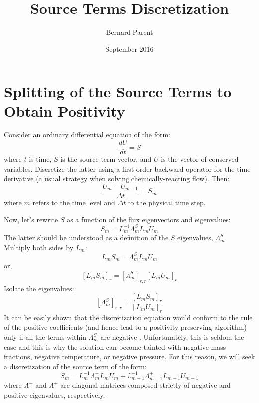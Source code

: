 \documentclass{warpdoc}
\author{
  Bernard Parent
}
\title{
  Source Terms Discretization
}
\date{
  September 2016
}
\begin{document}
\sloppy
  \pagestyle{headings}
  \setcounter{page}{1}
  \makewarpdoctitle
  \tableofcontents



\section{Splitting of the Source Terms to Obtain Positivity}

Consider an ordinary differential equation of the form:
%
\begin{equation}
\frac{d U}{d t}  = S 
\end{equation}
%
where $t$ is time, $S$ is the source term vector, and $U$ is the vector of conserved variables. Discretize the latter using a first-order backward operator for the time derivative (a usual strategy when solving chemically-reacting flow). Then:
%
\begin{equation}
\frac{U_{m}-U_{m-1}}{\Delta t} = S_{m} 
\label{eqn:disceq}
\end{equation}
%
where $m$ refers to the time level and $\Delta t$ to the physical time step.   

Now, let's rewrite $S$ as a function of the flux eigenvectors and eigenvalues:
%
\begin{equation}
 S_{m} = L^{-1}_{m} \Lambda_{m}^S L_{m} U_{m}
\label{eqn:S1}
\end{equation}
%
The latter should be understood as a definition of the $S$ eigenvalues, $\Lambda_{m}^S$. Multiply both sides by $L_{m}$:
%
\begin{equation}
 L_{m} S_{m} =  \Lambda_{m}^S L_{m} U_{m}
\end{equation}
%
or,
%
\begin{equation}
 \left[ L_{m} S_{m} \right]_{r} =  \left[ \Lambda_{m}^S\right]_{r,r} \left[L_{m} U_{m}\right]_r
\end{equation}
%
Isolate the eigenvalues:
%
\begin{equation}
\left[ \Lambda_{m}^S\right]_{r,r}=\frac{ \left[ L_{m} S_{m} \right]_{r}}{\left[L_{m} U_{m}\right]_r}  
\label{eqn:Lambda_S}
\end{equation}
%
It can be easily shown that the discretization equation would conform to the rule of the positive coefficients (and hence lead to a positivity-preserving algorithm) only if all the terms within $\Lambda_{m}^S$ are negative \cite{jcp:2012:parent}. Unfortunately, this is seldom the case and this is why the solution can become tainted with negative mass fractions, negative temperature, or negative pressure. For this reason, we will seek a discretization of the source term of the form:
%
\begin{equation}
  S_{m} = L^{-1}_{m} \Lambda_{m}^- L_{m} U_{m} + L^{-1}_{m-1} \Lambda_{m-1}^+ L_{m-1} U_{m-1}
  \label{eqn:source_split}
\end{equation}
%
where $\Lambda^-$ and $\Lambda^+$ are diagonal matrices composed strictly of negative and positive eigenvalues, respectively. 
\end{document}

